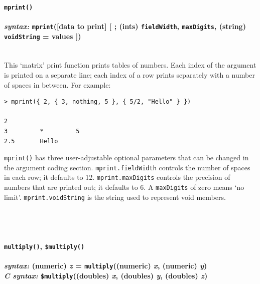 \documentclass{article}
\newenvironment{code}{
       \begin{list}{}{
               \setlength{\leftmargin}{.4in}
               \setlength{\rightmargin}{0in}
               \setlength{\topsep}{.2in}
       }
       \small
       \item[] }
       { \end{list}   }
\begin{document}

\paragraph{\texttt{mprint()}\\\\
\normalfont \emph{syntax: } \texttt{mprint}([data to print] [ ; (ints) \texttt{fieldWidth}, \texttt{maxDigits}, (string) \texttt{voidString} = values ])\\\\}

This `matrix' print function prints tables of numbers.  Each index of the argument is printed on a separate line; each index of a row prints separately with a number of spaces in between.  For example:

\begin{code} \begin{verbatim}
> mprint({ 2, { 3, nothing, 5 }, { 5/2, "Hello" } })

2
3         *         5         
2.5       Hello     
\end{verbatim} \end{code}

\noindent \texttt{mprint()} has three user-adjustable optional parameters that can be changed in the argument coding section.  \verb#mprint.fieldWidth# controls the number of spaces in each row; it defaults to 12.  \verb#mprint.maxDigits# controls the precision of numbers that are printed out; it defaults to 6.  A \verb#maxDigits# of zero means `no limit'.  \verb#mprint.voidString# is the string used to represent void members.\\\\\\\\




\paragraph{\texttt{multiply()}, \texttt{\$multiply()}\\\\
\normalfont \emph{syntax: } (numeric) \emph{z} = \texttt{multiply}((numeric) \emph{x}, (numeric) \emph{y})\\
\normalfont \emph{C syntax: } \texttt{\$multiply}((doubles) \emph{x}, (doubles) \emph{y}, (doubles) \emph{z})\\\\}
\end{document}
